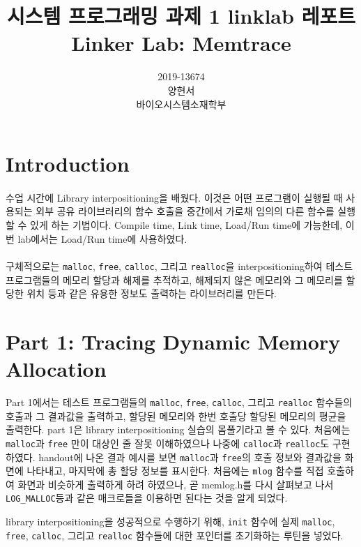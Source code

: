 \documentclass{report}
\title{시스템 프로그래밍 과제 1 linklab 레포트 \\
\large Linker Lab: Memtrace }
\date{}
\author{
  2019-13674\\
  양현서 \\
  바이오시스템소재학부\\
}
\begin{document}
\maketitle
\tableofcontents

\section{Introduction}
\paragraph{}
 수업 시간에 Library interpositioning을 배웠다. 이것은 어떤 프로그램이 실행될 때 사용되는 외부 공유 라이브러리의 함수 호출을 중간에서 가로채 임의의 다른 함수를 실행할 수 있게 하는 기법이다. Compile time, Link time, Load/Run time에 가능한데, 이번 lab에서는 Load/Run time에 사용하였다.
\paragraph{}
 구체적으로는 \lstinline{malloc}, \lstinline{free}, \lstinline{calloc}, 그리고 \lstinline{realloc}을 interpositioning하여 테스트 프로그램들의 메모리 할당과 해제를 추적하고, 해제되지 않은 메모리와 그 메모리를 할당한 위치 등과 같은 유용한 정보도 출력하는 라이브러리를 만든다.

\section{Part 1: Tracing Dynamic Memory Allocation}
Part 1에서는 테스트 프로그램들의 \lstinline{malloc}, \lstinline{free}, \lstinline{calloc}, 그리고 \lstinline{realloc} 함수들의 호출과 그 결과값을 출력하고, 할당된 메모리와 한번 호출당 할당된 메모리의 평균을 출력한다.
part 1은 library interpositioning 실습의 몸풀기라고 볼 수 있다. 처음에는 \lstinline{malloc}과 \lstinline{free} 만이 대상인 줄 잘못 이해하였으나 나중에 \lstinline{calloc}과 \lstinline{realloc}도 구현하였다. handout에 나온 결과 예시를 보면 \lstinline{malloc}과 \lstinline{free}의 호출 정보와 결과값을 화면에 나타내고, 마지막에 총 할당 정보를 표시한다. 처음에는 \lstinline{mlog} 함수를 직접 호출하여 화면과 비슷하게 출력하게 하려 하였으나, 곧 memlog.h를 다시 살펴보고 나서 \lstinline{LOG_MALLOC}등과 같은 매크로들을 이용하면 된다는 것을 알게 되었다.


library interpositioning을 성공적으로 수행하기 위해, \lstinline{init} 함수에 실제  \lstinline{malloc}, \lstinline{free}, \lstinline{calloc}, 그리고 \lstinline{realloc} 함수들에 대한 포인터를 초기화하는 루틴을 넣었다.
\end{document}

